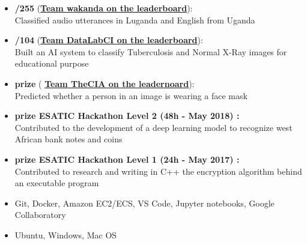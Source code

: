 \documentclass[11pt,a4paper,ragged2e, withhyper]{altacv}
\begin{document}


\smallskip
\begin{itemize}
      \item \textbf{/255 } (\textbf{\href{https://zindi.africa/competitions/giz-nlp-agricultural-keyword-spotter/leaderboard}{Team wakanda on the leaderboard}}): \\Classified audio utterances in Luganda and English from Uganda
      \item \textbf{/104 } (\textbf{\href{https://zindi.africa/competitions/runmila-ai-institute-minohealth-ai-labs-tuberculosis-classification-via-x-rays-challenge/leaderboard}{Team DataLabCI on the leaderboard}}): \\Built an AI system to classify Tuberculosis and Normal X-Ray images for educational purpose
      \item \textbf{ prize } (\textbf{ \href{https://zindi.africa/competitions/spot-the-mask-challenge}{Team TheCIA on the leadernoard}}): \\Predicted whether a person in an image is wearing a face mask
      \item \textbf{ prize ESATIC Hackathon Level 2 (48h - May 2018) :} \\Contributed to the development of a deep learning model to recognize west African bank notes and coins
      \item \textbf{ prize ESATIC Hackathon Level 1 (24h - May 2017) :} \\Contributed to research and writing in C++ the encryption algorithm behind an executable program

\end{itemize}

\smallskip
\begin{itemize}
      \item Git, Docker, Amazon EC2/ECS, VS Code, Jupyter notebooks, Google Collaboratory
            \smallskip

      \item Ubuntu, Windows, Mac OS
            \smallskip
\end{itemize}
\end{document}
